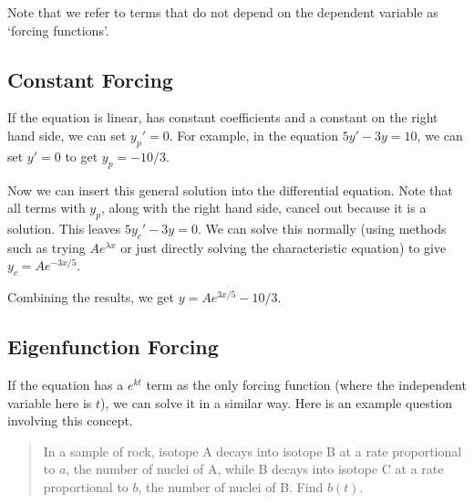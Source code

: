 \documentclass{article}
\begin{document}
	Note that we refer to terms that do not depend on the dependent variable as `forcing functions'.
		
	\subsection{Constant Forcing}
	If the equation is linear, has constant coefficients and a constant on the right hand side, we can set $y_p' = 0$. For example, in the equation $5y' - 3y = 10$, we can set $y' = 0$ to get $y_p = -10/3$.
	
	Now we can insert this general solution into the differential equation. Note that all terms with $y_p$, along with the right hand side, cancel out because it is a solution. This leaves $5y_c' - 3y = 0$. We can solve this normally (using methods such as trying $Ae^{\lambda x}$ or just directly solving the characteristic equation) to give $y_c = Ae^{-3x/5}$.
	
	Combining the results, we get $y = Ae^{3x/5} - 10/3$.
	
	\subsection{Eigenfunction Forcing}
	If the equation has a $e^{kt}$ term as the only forcing function (where the independent variable here is $t$), we can solve it in a similar way. Here is an example question involving this concept.
	
	\begin{quote}
		In a sample of rock, isotope A decays into isotope B at a rate proportional to $a$, the number of nuclei of A, while B decays into isotope C at a rate proportional to $b$, the number of nuclei of B. Find $b(t)$.
	\end{quote}
\end{document}
